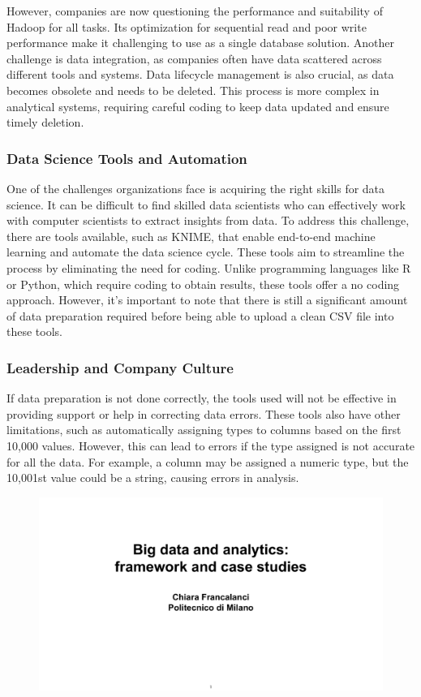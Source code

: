 However, companies are now questioning the performance and suitability
of Hadoop for all tasks. Its optimization for sequential read and poor
write performance make it challenging to use as a single database
solution. Another challenge is data integration, as companies often have
data scattered across different tools and systems. Data lifecycle
management is also crucial, as data becomes obsolete and needs to be
deleted. This process is more complex in analytical systems, requiring
careful coding to keep data updated and ensure timely deletion.


\subsubsection{Data Science Tools and Automation}

One of the challenges organizations face is acquiring the right skills
for data science. It can be difficult to find skilled data scientists
who can effectively work with computer scientists to extract insights
from data. To address this challenge, there are tools available, such as
KNIME, that enable end-to-end machine learning and automate the data
science cycle. These tools aim to streamline the process by eliminating
the need for coding. Unlike programming languages like R or Python,
which require coding to obtain results, these tools offer a no coding
approach. However, it's important to note that there is still a
significant amount of data preparation required before being able to
upload a clean CSV file into these tools.

\subsubsection{Leadership and Company Culture}

If data preparation is not done correctly, the tools used will not be
effective in providing support or help in correcting data errors. These
tools also have other limitations, such as automatically assigning types
to columns based on the first 10,000 values. However, this can lead to
errors if the type assigned is not accurate for all the data. For
example, a column may be assigned a numeric type, but the 10,001st value
could be a string, causing errors in analysis.

\begin{figure}[!h]
  \centering
  \includegraphics[page=55, trim = 1.5cm 4cm 1cm 4.5cm, clip, width=\imagewidth]{images/06 - BIG_DATA.pdf}
\end{figure}

